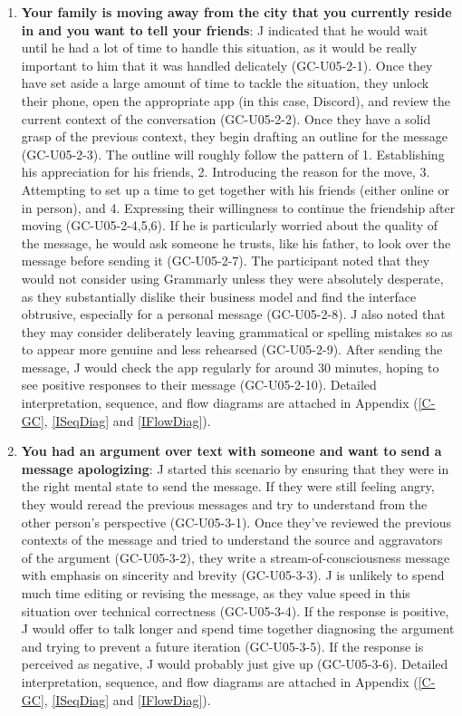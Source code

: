 \documentclass[acmsmall,screen,authorversion,nonacm]{acmart}
\begin{document}
\begin{enumerate}
    \item \textbf{Your family is moving away from the city that you currently reside in and you want to tell your friends}: J indicated that he would wait until he had a lot of time to handle this situation, as it would be really important to him that it was handled delicately (GC-U05-2-1). Once they have set aside a large amount of time to tackle the situation, they unlock their phone, open the appropriate app (in this case, Discord), and review the current context of the conversation (GC-U05-2-2). Once they have a solid grasp of the previous context, they begin drafting an outline for the message (GC-U05-2-3). The outline will roughly follow the pattern of 1. Establishing his appreciation for his friends, 2. Introducing the reason for the move, 3. Attempting to set up a time to get together with his friends (either online or in person), and 4. Expressing their willingness to continue the friendship after moving (GC-U05-2-4,5,6). If he is particularly worried about the quality of the message, he would ask someone he trusts, like his father, to look over the message before sending it (GC-U05-2-7). The participant noted that they would not consider using Grammarly unless they were absolutely desperate, as they substantially dislike their business model and find the interface obtrusive, especially for a personal message (GC-U05-2-8). J also noted that they may consider deliberately leaving grammatical or spelling mistakes so as to appear more genuine and less rehearsed (GC-U05-2-9). After sending the message, J would check the app regularly for around 30 minutes, hoping to see positive responses to their message (GC-U05-2-10). Detailed interpretation, sequence, and flow diagrams are attached in Appendix (\ref{C-GC}, \ref{ISeqDiag} and \ref{IFlowDiag}). 

    \item \textbf{You had an argument over text with someone and want to send a message apologizing}: J started this scenario by ensuring that they were in the right mental state to send the message. If they were still feeling angry, they would reread the previous messages and try to understand from the other person’s perspective (GC-U05-3-1). Once they’ve reviewed the previous contexts of the message and tried to understand the source and aggravators of the argument (GC-U05-3-2), they write a stream-of-consciousness message with emphasis on sincerity and brevity (GC-U05-3-3). J is unlikely to spend much time editing or revising the message, as they value speed in this situation over technical correctness (GC-U05-3-4). If the response is positive, J would offer to talk longer and spend time together diagnosing the argument and trying to prevent a future iteration (GC-U05-3-5). If the response is perceived as negative, J would probably just give up (GC-U05-3-6). Detailed interpretation, sequence, and flow diagrams are attached in Appendix (\ref{C-GC}, \ref{ISeqDiag} and \ref{IFlowDiag}). 

\end{enumerate}
\end{document}

